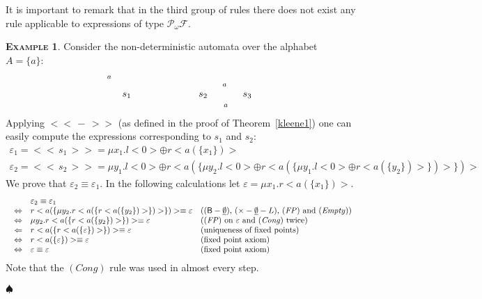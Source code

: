 \documentclass{LMCS}
\def\pow{{\mathcal P_{\!\!\!\omega}}}
\newcommand\E\varepsilon
\newcommand\B{\mathsf{B}}
\newcommand\F{\mathcal{F}}
\newcommand\emp{\underline\emptyset}
\def\expr#1{<\!< \, #1 \, >\!>}
\def\hyph{-\penalty0\hskip0pt\relax}
\theoremstyle{definition}
\theoremstyle{plain}
\theoremstyle{plain}
\theoremstyle{plain}
\theoremstyle{plain}
\theoremstyle{definition}
\theoremstyle{definition}
\newtheorem{myexample}[mydefinition]{\textsc{Example}}
\newenvironment{example}{
\begin{myexample}}
    {\hfill$\spadesuit$\end{myexample}}
\begin{document}
It is important to remark that in the third group of rules
there does 
not exist any rule applicable to expressions of type $\pow \F$. 


\begin{example}
Consider the non\hyph deterministic automata over the alphabet~$A=\{a\}$:
\[
\xymatrix{*++[o][F]{s_1}
\ar@(l,u)^-{a}}\hspace{2cm}\xymatrix{*++[o][F]{s_2} \ar@/^/[r]^-{a}&
*++[o][F]{s_3} \ar@/^/[l]^-{a}}
\] 
Applying $\expr -$ (as defined in the proof of Theorem~\ref{kleene1}) one can easily compute 
the expressions corresponding to $s_1$ and $s_2$:
\[
\begin{array}{l}
\E_1 = \expr{s_1} = \mu x_1. l<0> \oplus r<a(\{x_1\})>\\ 
\E_2 = \expr{s_2} = \mu y_1. l<0> \oplus r< a(\{\mu y_2. l<0> \oplus r<a(\{\mu y_1. l<0> \oplus r<a(\{y_2\})> \})>\})>
\end{array}
\]
We prove that $\E_2\equiv \E_1$. 
 In the following calculations let $\E = \mu x_1. r<a(\{x_1\})>$.
\[
\begin{array}{@{}lcll}
&& \E_2\equiv \E_1 \\
&\Leftrightarrow & r<a(\{\mu y_2. r<a(\{r<a(\{y_2\})>\})>\})>
\equiv \E & \text{($(\B-\emp)$, $(\times - \emp - L)$, $\mathit{(FP)}$ and $\mathit{(Empty)}$)}\\
&\Leftrightarrow& \mu y_2. r<a(\{r<a(\{y_2\})>\})> \equiv \E &\text{($(\mathit{FP})$ on $\E$ and $(\mathit{Cong})$ twice)}\\
&\Leftarrow &  r<a(\{r<a(\{\E\})>\})>  \equiv \E & \text{(uniqueness of fixed points)}
\\
&\Leftrightarrow &  r<a(\{\E\})> \equiv \E &\text{(fixed point axiom)}
\\
&\Leftrightarrow & \E \equiv \E
&\text{(fixed point axiom)}\end{array}
\]
Note that the $(\mathit{Cong})$ rule was used in almost every step.


\end{example}
\end{document}
